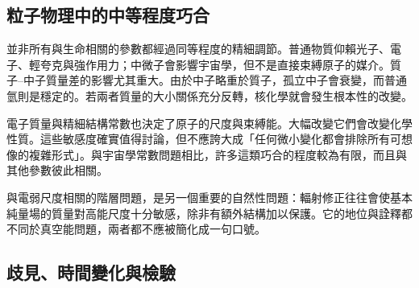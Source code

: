 \begin{classroomqa}
\end{classroomqa}

\subsection{粒子物理中的中等程度巧合}

並非所有與生命相關的參數都經過同等程度的精細調節。普通物質仰賴光子、電子、輕夸克與強作用力；中微子會影響宇宙學，但不是直接束縛原子的媒介。質子--中子質量差的影響尤其重大。由於中子略重於質子，孤立中子會衰變，而普通氫則是穩定的。若兩者質量的大小關係充分反轉，核化學就會發生根本性的改變。

電子質量與精細結構常數也決定了原子的尺度與束縛能。大幅改變它們會改變化學性質。這些敏感度確實值得討論，但不應誇大成「任何微小變化都會排除所有可想像的複雜形式」。與宇宙學常數問題相比，許多這類巧合的程度較為有限，而且與其他參數彼此相關。

與電弱尺度相關的階層問題，是另一個重要的自然性問題：輻射修正往往會使基本純量場的質量對高能尺度十分敏感，除非有額外結構加以保護。它的地位與詮釋都不同於真空能問題，兩者都不應被簡化成一句口號。

\begin{classroomqa}
\end{classroomqa}

\begin{classroomqa}
\end{classroomqa}

\subsection{歧見、時間變化與檢驗}

